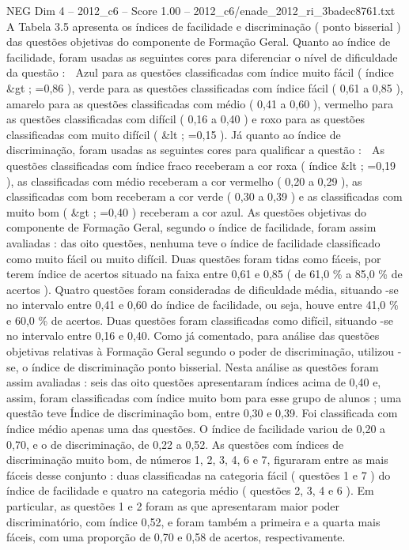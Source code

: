 \begin{textsample}{NEG Dim 4 – 2012\_c6 – Score 1.00 – 2012\_c6/enade\_2012\_ri\_3badec8761.txt}
A Tabela 3.5 apresenta os índices de facilidade e discriminação ( ponto bisserial ) das questões objetivas do componente de Formação Geral.
Quanto ao índice de facilidade, foram usadas as seguintes cores para diferenciar o nível de dificuldade da questão :  Azul para as questões classificadas com índice muito fácil ( índice \&gt ; =0,86 ), verde para as questões classificadas com índice fácil ( 0,61 a 0,85 ), amarelo para as questões classificadas com médio ( 0,41 a 0,60 ), vermelho para as questões classificadas com difícil ( 0,16 a 0,40 ) e roxo para as questões classificadas com muito difícil ( \&lt ; =0,15 ).
Já quanto ao índice de discriminação, foram usadas as seguintes cores para qualificar a questão :  As questões classificadas com índice fraco receberam a cor roxa ( índice \&lt ; =0,19 ), as classificadas com médio receberam a cor vermelho ( 0,20 a 0,29 ), as classificadas com bom receberam a cor verde ( 0,30 a 0,39 ) e as classificadas com muito bom ( \&gt ; =0,40 ) receberam a cor azul.
As questões objetivas do componente de Formação Geral, segundo o índice de facilidade, foram assim avaliadas : das oito questões, nenhuma teve o índice de facilidade classificado como muito fácil ou muito difícil.
Duas questões foram tidas como fáceis, por terem índice de acertos situado na faixa entre 0,61 e 0,85 ( de 61,0 \% a 85,0 \% de acertos ).
Quatro questões foram consideradas de dificuldade média, situando -se no intervalo entre 0,41 e 0,60 do índice de facilidade, ou seja, houve entre 41,0 \% e 60,0 \% de acertos.
Duas questões foram classificadas como difícil, situando -se no intervalo entre 0,16 e 0,40.
Como já comentado, para análise das questões objetivas relativas à Formação Geral segundo o poder de discriminação, utilizou -se, o índice de discriminação ponto bisserial.
Nesta análise as questões foram assim avaliadas : seis das oito questões apresentaram índices acima de 0,40 e, assim, foram classificadas com índice muito bom para esse grupo de alunos ; uma questão teve Índice de discriminação bom, entre 0,30 e 0,39.
Foi classificada com índice médio apenas uma das questões.
O índice de facilidade variou de 0,20 a 0,70, e o de discriminação, de 0,22 a 0,52.
As questões com índices de discriminação muito bom, de números 1, 2, 3, 4, 6 e 7, figuraram entre as mais fáceis desse conjunto : duas classificadas na categoria fácil ( questões 1 e 7 ) do índice de facilidade e quatro na categoria médio ( questões 2, 3, 4 e 6 ).
Em particular, as questões 1 e 2 foram as que apresentaram maior poder discriminatório, com índice 0,52, e foram também a primeira e a quarta mais fáceis, com uma proporção de 0,70 e 0,58 de acertos, respectivamente.

\end{textsample}
